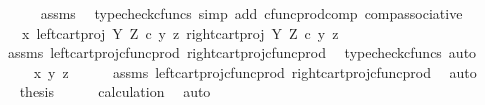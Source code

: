 \begin{isabellebody}
\ \ \ \ \isamarkupfalse%
\ assms\ \isamarkupfalse%
\ {\isacharparenleft}{\kern0pt}typecheck{\isacharunderscore}{\kern0pt}cfuncs{\isacharcomma}{\kern0pt}\ simp\ add{\isacharcolon}{\kern0pt}\ cfunc{\isacharunderscore}{\kern0pt}prod{\isacharunderscore}{\kern0pt}comp\ comp{\isacharunderscore}{\kern0pt}associative{}{\isacharparenright}{\kern0pt}\isanewline
\ \ \isamarkupfalse%
\ \isamarkupfalse%
\ {\isachardoublequoteopen}{\isachardot}{\kern0pt}{\isachardot}{\kern0pt}{\isachardot}{\kern0pt}\ {\isacharequal}{\kern0pt}\ {\isasymlangle}{\isasymlangle}x{\isacharcomma}{\kern0pt}\ left{\isacharunderscore}{\kern0pt}cart{\isacharunderscore}{\kern0pt}proj\ Y\ Z\ {\isasymcirc}\isactrlsub c\ {\isasymlangle}y{\isacharcomma}{\kern0pt}\ z{\isasymrangle}{\isasymrangle}{\isacharcomma}{\kern0pt}\ right{\isacharunderscore}{\kern0pt}cart{\isacharunderscore}{\kern0pt}proj\ Y\ Z\ {\isasymcirc}\isactrlsub c\ {\isasymlangle}y{\isacharcomma}{\kern0pt}\ z{\isasymrangle}{\isasymrangle}{\isachardoublequoteclose}\isanewline
\ \ \ \ \isamarkupfalse%
\ assms\ left{\isacharunderscore}{\kern0pt}cart{\isacharunderscore}{\kern0pt}proj{\isacharunderscore}{\kern0pt}cfunc{\isacharunderscore}{\kern0pt}prod\ right{\isacharunderscore}{\kern0pt}cart{\isacharunderscore}{\kern0pt}proj{\isacharunderscore}{\kern0pt}cfunc{\isacharunderscore}{\kern0pt}prod\ \isamarkupfalse%
\ {\isacharparenleft}{\kern0pt}typecheck{\isacharunderscore}{\kern0pt}cfuncs{\isacharcomma}{\kern0pt}\ auto{\isacharparenright}{\kern0pt}\isanewline
\ \ \isamarkupfalse%
\ \isamarkupfalse%
\ {\isachardoublequoteopen}{\isachardot}{\kern0pt}{\isachardot}{\kern0pt}{\isachardot}{\kern0pt}\ {\isacharequal}{\kern0pt}\ {\isasymlangle}{\isasymlangle}x{\isacharcomma}{\kern0pt}\ y{\isasymrangle}{\isacharcomma}{\kern0pt}\ z{\isasymrangle}{\isachardoublequoteclose}\isanewline
\ \ \ \ \isamarkupfalse%
\ assms\ left{\isacharunderscore}{\kern0pt}cart{\isacharunderscore}{\kern0pt}proj{\isacharunderscore}{\kern0pt}cfunc{\isacharunderscore}{\kern0pt}prod\ right{\isacharunderscore}{\kern0pt}cart{\isacharunderscore}{\kern0pt}proj{\isacharunderscore}{\kern0pt}cfunc{\isacharunderscore}{\kern0pt}prod\ \isamarkupfalse%
\ auto\isanewline
\ \ \isamarkupfalse%
\ \isamarkupfalse%
\ {\isacharquery}{\kern0pt}thesis\isanewline
\ \ \ \ \isamarkupfalse%
\ calculation\ \isamarkupfalse%
\ auto\isanewline
{}\isamarkupfalse%

\end{isabellebody}

